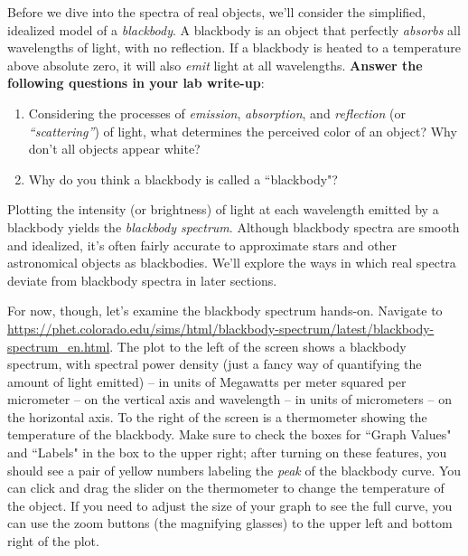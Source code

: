 \documentclass[11pt]{article}
\begin{document}
Before we dive into the spectra of real objects, we'll consider the simplified, idealized model of a \emph{blackbody}. A blackbody is an object that perfectly \emph{absorbs} all wavelengths of light, with no reflection. If a blackbody is heated to a temperature above absolute zero, it will also \emph{emit} light at all wavelengths. \textbf{Answer the following questions in your lab write-up}:
\begin{enumerate}
    \item Considering the processes of \emph{emission}, \emph{absorption}, and \emph{reflection} (or \emph{``scattering''}) of light, what determines the perceived color of an object? Why don't all objects appear white? 
    \item Why do you think a blackbody is called a ``blackbody"?
\end{enumerate}

Plotting the intensity (or brightness) of light at each wavelength emitted by a blackbody yields the \emph{blackbody spectrum}. Although blackbody spectra are smooth and idealized, it's often fairly accurate to approximate stars and other astronomical objects as blackbodies. We'll explore the ways in which real spectra deviate from blackbody spectra in later sections.

\bigskip

For now, though, let's examine the blackbody spectrum hands-on. Navigate to \url{https://phet.colorado.edu/sims/html/blackbody-spectrum/latest/blackbody-spectrum_en.html}. The plot to the left of the screen shows a blackbody spectrum, with spectral power density (just a fancy way of quantifying the amount of light emitted) -- in units of Megawatts per meter squared per micrometer -- on the vertical axis and wavelength -- in units of micrometers -- on the horizontal axis. To the right of the screen is a thermometer showing the temperature of the blackbody. Make sure to check the boxes for ``Graph Values" and ``Labels" in the box to the upper right; after turning on these features, you should see a pair of yellow numbers labeling the \emph{peak} of the blackbody curve. You can click and drag the slider on the thermometer to change the temperature of the object. If you need to adjust the size of your graph to see the full curve, you can use the zoom buttons (the magnifying glasses) to the upper left and bottom right of the plot.
\end{document}
